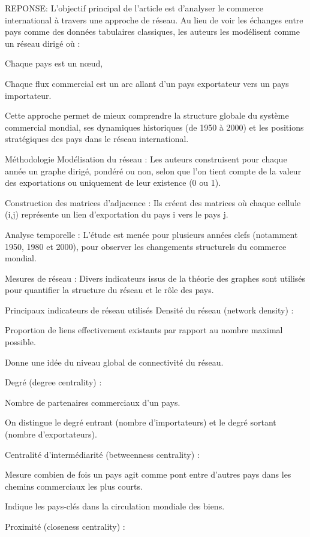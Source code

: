 \documentclass[
]{article}
\begin{document}
REPONSE: L'objectif principal de l'article est d'analyser le commerce
international à travers une approche de réseau. Au lieu de voir les
échanges entre pays comme des données tabulaires classiques, les auteurs
les modélisent comme un réseau dirigé où :

Chaque pays est un nœud,

Chaque flux commercial est un arc allant d'un pays exportateur vers un
pays importateur.

Cette approche permet de mieux comprendre la structure globale du
système commercial mondial, ses dynamiques historiques (de 1950 à 2000)
et les positions stratégiques des pays dans le réseau international.

Méthodologie Modélisation du réseau : Les auteurs construisent pour
chaque année un graphe dirigé, pondéré ou non, selon que l'on tient
compte de la valeur des exportations ou uniquement de leur existence (0
ou 1).

Construction des matrices d'adjacence : Ils créent des matrices où
chaque cellule (i,j) représente un lien d'exportation du pays i vers le
pays j.

Analyse temporelle : L'étude est menée pour plusieurs années clefs
(notamment 1950, 1980 et 2000), pour observer les changements
structurels du commerce mondial.

Mesures de réseau : Divers indicateurs issus de la théorie des graphes
sont utilisés pour quantifier la structure du réseau et le rôle des
pays.

Principaux indicateurs de réseau utilisés Densité du réseau (network
density) :

Proportion de liens effectivement existants par rapport au nombre
maximal possible.

Donne une idée du niveau global de connectivité du réseau.

Degré (degree centrality) :

Nombre de partenaires commerciaux d'un pays.

On distingue le degré entrant (nombre d'importateurs) et le degré
sortant (nombre d'exportateurs).

Centralité d'intermédiarité (betweenness centrality) :

Mesure combien de fois un pays agit comme pont entre d'autres pays dans
les chemins commerciaux les plus courts.

Indique les pays-clés dans la circulation mondiale des biens.

Proximité (closeness centrality) :
\end{document}
